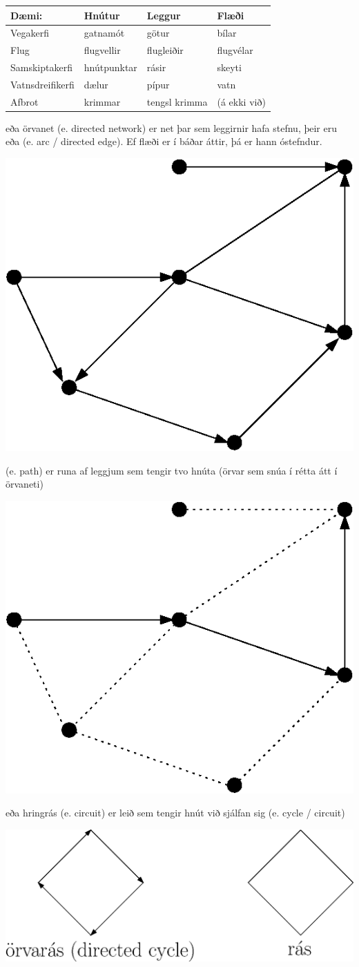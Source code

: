 \begin{description}
\begin{center}
\begin{tabular}{|l|lll|}
\hline
Dæmi: & Hnútur & Leggur & Flæði \\ \hline
Vegakerfi & gatnamót & götur  & bílar \\
Flug & flugvellir &  flugleiðir & flugvélar \\
Samskiptakerfi & hnútpunktar & rásir & skeyti\\
Vatnsdreifikerfi & dælur & pípur & vatn \\
Afbrot & krimmar & tengsl krimma & (á ekki við) \\
\hline
\end{tabular}
\end{center}
 \item[\athsup{Stefnt net}{netafræði}] eða örvanet (e. directed network) er net þar sem leggirnir hafa stefnu, þeir eru  eða  (e. arc / directed edge). Ef flæði er í báðar áttir, þá er hann óstefndur. %
 \begin{center} \includegraphics[width=0.24\columnwidth]{figs/directed.eps} \end{center}
 \item[\athsup{Leið}{netafræði}] (e. path) er runa af leggjum sem tengir tvo hnúta (örvar sem snúa í rétta átt í örvaneti)
 \begin{center} \includegraphics[width=0.27\columnwidth]{figs/path.eps} \end{center}
 \item[\athsup{Rás}{netafræði}] eða hringrás (e. circuit) er leið sem tengir hnút við sjálfan sig (e. cycle / circuit) 
 \begin{center} \includegraphics[width=0.6\columnwidth]{figs/cycle.eps} \end{center}

\end{description}

